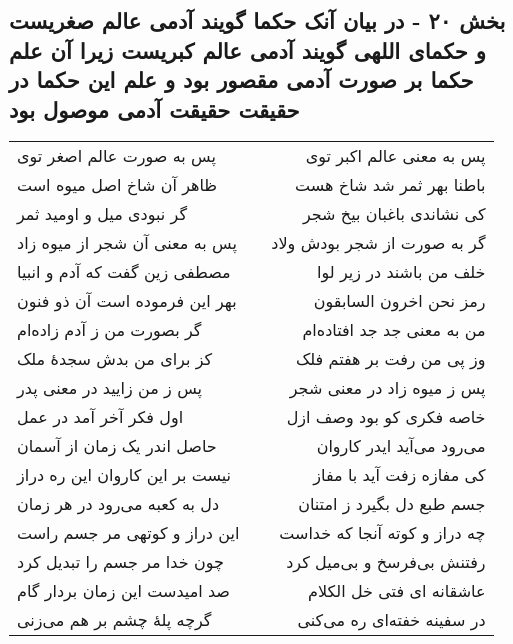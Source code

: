 \begin{center}
\section*{بخش ۲۰ - در بیان آنک حکما گویند آدمی عالم صغریست و حکمای اللهی گویند آدمی عالم کبریست زیرا آن علم حکما بر صورت آدمی مقصور بود و علم این حکما در حقیقت حقیقت آدمی موصول بود}
\label{sec:sh020}
\begin{longtable}{l p{0.5cm} r}
پس به صورت عالم اصغر توی
&&
پس به معنی عالم اکبر توی
\\
ظاهر آن شاخ اصل میوه است
&&
باطنا بهر ثمر شد شاخ هست
\\
گر نبودی میل و اومید ثمر
&&
کی نشاندی باغبان بیخ شجر
\\
پس به معنی آن شجر از میوه زاد
&&
گر به صورت از شجر بودش ولاد
\\
مصطفی زین گفت که آدم و انبیا
&&
خلف من باشند در زیر لوا
\\
بهر این فرموده است آن ذو فنون
&&
رمز نحن اخرون السابقون
\\
گر بصورت من ز آدم زاده‌ام
&&
من به معنی جد جد افتاده‌ام
\\
کز برای من بدش سجدهٔ ملک
&&
وز پی من رفت بر هفتم فلک
\\
پس ز من زایید در معنی پدر
&&
پس ز میوه زاد در معنی شجر
\\
اول فکر آخر آمد در عمل
&&
خاصه فکری کو بود وصف ازل
\\
حاصل اندر یک زمان از آسمان
&&
می‌رود می‌آید ایدر کاروان
\\
نیست بر این کاروان این ره دراز
&&
کی مفازه زفت آید با مفاز
\\
دل به کعبه می‌رود در هر زمان
&&
جسم طبع دل بگیرد ز امتنان
\\
این دراز و کوتهی مر جسم راست
&&
چه دراز و کوته آنجا که خداست
\\
چون خدا مر جسم را تبدیل کرد
&&
رفتنش بی‌فرسخ و بی‌میل کرد
\\
صد امیدست این زمان بردار گام
&&
عاشقانه ای فتی خل الکلام
\\
گرچه پلهٔ چشم بر هم می‌زنی
&&
در سفینه خفته‌ای ره می‌کنی
\\
\end{longtable}
\end{center}
